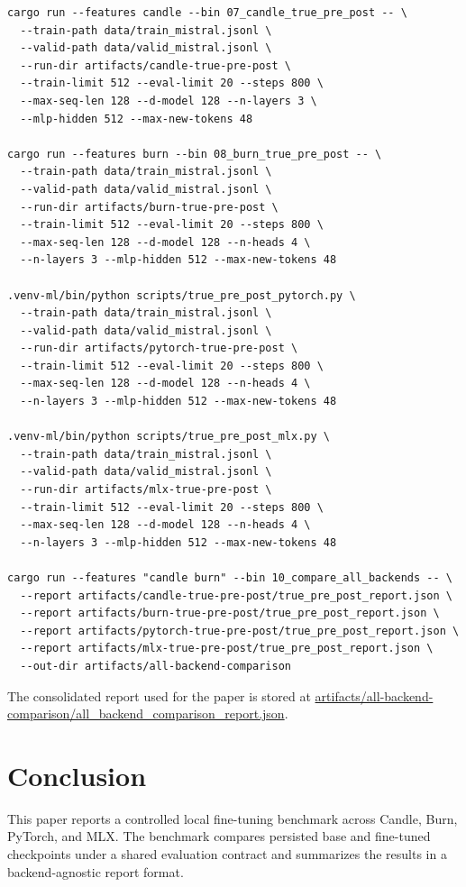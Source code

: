 \documentclass[11pt]{article}
\begin{document}
\begingroup
\small
\begin{verbatim}
cargo run --features candle --bin 07_candle_true_pre_post -- \
  --train-path data/train_mistral.jsonl \
  --valid-path data/valid_mistral.jsonl \
  --run-dir artifacts/candle-true-pre-post \
  --train-limit 512 --eval-limit 20 --steps 800 \
  --max-seq-len 128 --d-model 128 --n-layers 3 \
  --mlp-hidden 512 --max-new-tokens 48

cargo run --features burn --bin 08_burn_true_pre_post -- \
  --train-path data/train_mistral.jsonl \
  --valid-path data/valid_mistral.jsonl \
  --run-dir artifacts/burn-true-pre-post \
  --train-limit 512 --eval-limit 20 --steps 800 \
  --max-seq-len 128 --d-model 128 --n-heads 4 \
  --n-layers 3 --mlp-hidden 512 --max-new-tokens 48

.venv-ml/bin/python scripts/true_pre_post_pytorch.py \
  --train-path data/train_mistral.jsonl \
  --valid-path data/valid_mistral.jsonl \
  --run-dir artifacts/pytorch-true-pre-post \
  --train-limit 512 --eval-limit 20 --steps 800 \
  --max-seq-len 128 --d-model 128 --n-heads 4 \
  --n-layers 3 --mlp-hidden 512 --max-new-tokens 48

.venv-ml/bin/python scripts/true_pre_post_mlx.py \
  --train-path data/train_mistral.jsonl \
  --valid-path data/valid_mistral.jsonl \
  --run-dir artifacts/mlx-true-pre-post \
  --train-limit 512 --eval-limit 20 --steps 800 \
  --max-seq-len 128 --d-model 128 --n-heads 4 \
  --n-layers 3 --mlp-hidden 512 --max-new-tokens 48

cargo run --features "candle burn" --bin 10_compare_all_backends -- \
  --report artifacts/candle-true-pre-post/true_pre_post_report.json \
  --report artifacts/burn-true-pre-post/true_pre_post_report.json \
  --report artifacts/pytorch-true-pre-post/true_pre_post_report.json \
  --report artifacts/mlx-true-pre-post/true_pre_post_report.json \
  --out-dir artifacts/all-backend-comparison
\end{verbatim}
\endgroup

The consolidated report used for the paper is stored at \url{artifacts/all-backend-comparison/all_backend_comparison_report.json}.

\section{Conclusion}

This paper reports a controlled local fine-tuning benchmark across Candle, Burn, PyTorch, and MLX. The benchmark compares persisted base and fine-tuned checkpoints under a shared evaluation contract and summarizes the results in a backend-agnostic report format.
\end{document}

